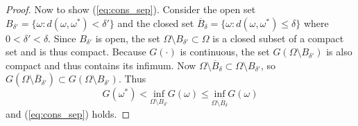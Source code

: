 \begin{proof}
Now to show (\ref{eq:cons_sep}). Consider the open set $B_{\delta'} = 
\{\omega : d(\omega, \omega^*) < \delta'\}$ and the closed set 
$\overline{B}_{\delta} = \{\omega : d(\omega, \omega^*) \leq \delta\}$ 
where $0 < \delta' < \delta$. Since $B_{\delta'}$ is open, the set 
$\Omega \setminus B_{\delta'} \subset \Omega$ is a closed subset of a 
compact set and is thus compact. Because  $G(\cdot)$ is continuous, the 
set $G(\Omega \setminus B_{\delta'})$ is also compact and thus contains 
its infimum. Now $\Omega \setminus \overline{B}_{\delta} \subset \Omega 
\setminus B_{\delta'}$, so $G(\Omega \setminus \overline{B}_{\delta'}) 
\subset G(\Omega \setminus B_{\delta'})$. Thus 
\[
     G(\omega^*) < \underset{\Omega \setminus B_{\delta'}}{\text{inf}} 
     G(\omega) \leq \underset{\Omega \setminus 
     \overline{B}_{\delta}}{\text{inf}} G(\omega)
\]
and (\ref{eq:cons_sep}) holds.
\end{proof}







